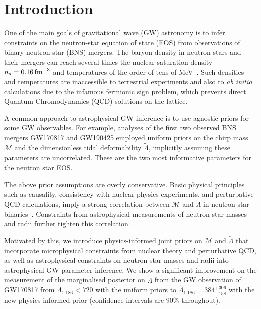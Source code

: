\documentclass[twocolumn,linenumbers]{aastex631}
\newcommand{\blue}[1]{\textcolor{blue}{\textbf{#1}}}
\begin{document}
		
\section{Introduction}
\label{sec:Intro}
	
One of the main goals of gravitational wave (GW) astronomy is to infer
constraints on the neutron-star equation of state (EOS) from observations
of binary neutron star (BNS) mergers. The baryon density in neutron stars
and their mergers can reach several times the nuclear saturation density
$n_s=0.16\,{\rm fm}^{-3}$ and temperatures of the order of tens of
MeV~\citep[see, e.g.,][for reviews]{Baiotti2016,
  Paschalidis2016,Radice2020b}. Such densities and temperatures are
inaccessible to terrestrial experiments and also to \textit{ab initio}
calculations due to the infamous fermionic sign problem, which prevents
direct Quantum Chromodynamics (QCD) solutions on the lattice.

A common approach to astrophysical GW inference is to use agnostic priors
for some GW observables. For example, analyses of the first two observed
BNS mergers GW170817 \citep[e.g.,][]{abbott17_170817observation,
  abbott18_170817EOS, abbott19_170817Properties} and GW190425
\citep[e.g.,][]{abbott20_190425} employed uniform priors on the chirp
mass $\mathcal{M}$ and the dimensionless tidal deformability
$\tilde{\Lambda}$, implicitly assuming these parameters are
uncorrelated. These are the two most informative parameters for the
neutron star EOS.

The above prior assumptions are overly conservative. Basic physical
principles such as causality, consistency with nuclear-physics
experiments, and perturbative QCD calculations, imply a strong
correlation between $\mathcal{M}$ and $\tilde{\Lambda}$ in neutron-star
binaries~\blue{\citep{Altiparmak:2022}}. Constraints from astrophysical
measurements of neutron-star masses and radii further tighten this
correlation~\citep{Ecker:2022, Ecker:2022dlg}.

Motivated by this, we introduce physics-informed joint priors on
$\mathcal{M}$ and $\tilde{\Lambda}$ that incorporate microphysical
constraints from nuclear theory and perturbative QCD, as well as
astrophysical constraints on neutron-star masses and radii into
astrophysical GW parameter inference. We show a significant improvement
on the measurement of the marginalised posterior on $\tilde{\Lambda}$
from the GW observation of GW170817 from $\tilde{\Lambda}_{1.186} < 720$
with the uniform priors to $\tilde{\Lambda}_{1.186} = 384^{+306}_{-158}$
with the new physics-informed prior (confidence intervals are $90\%$
throughout).
\end{document}
